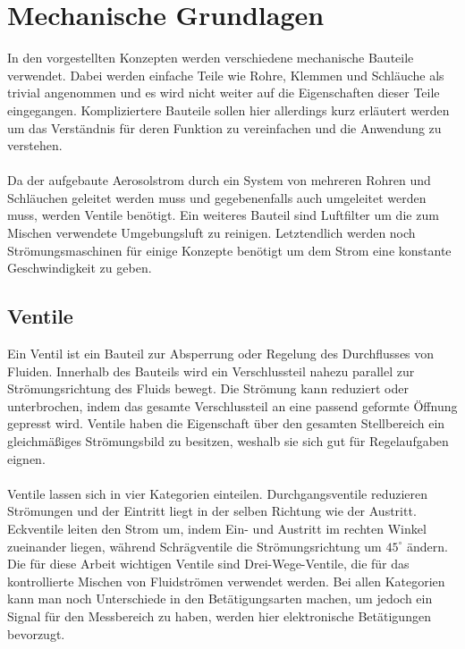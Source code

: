 \section{Mechanische Grundlagen}
In den vorgestellten Konzepten werden verschiedene mechanische Bauteile verwendet. Dabei werden einfache Teile wie Rohre, Klemmen und Schl\"{a}uche als trivial angenommen und es wird nicht weiter auf die Eigenschaften dieser Teile eingegangen. Kompliziertere Bauteile sollen hier allerdings kurz erl\"{a}utert werden um das Verst\"{a}ndnis f\"{u}r deren Funktion zu vereinfachen und die Anwendung zu verstehen.
\\\\
Da der aufgebaute Aerosolstrom durch ein System von mehreren Rohren und Schl\"{a}uchen geleitet werden muss und gegebenenfalls auch umgeleitet werden muss, werden Ventile ben\"{o}tigt. Ein weiteres Bauteil sind Luftfilter um die zum Mischen verwendete Umgebungsluft zu reinigen. Letztendlich werden noch Str\"{o}mungsmaschinen f\"{u}r einige Konzepte ben\"{o}tigt um dem Strom eine konstante Geschwindigkeit zu geben.

\subsection{Ventile}
Ein Ventil ist ein Bauteil zur Absperrung oder Regelung des Durchflusses von Fluiden. Innerhalb des Bauteils wird ein Verschlussteil nahezu parallel zur Str\"{o}mungsrichtung des Fluids bewegt. Die Str\"{o}mung kann reduziert oder unterbrochen, indem das gesamte Verschlussteil an eine passend geformte \"{O}ffnung gepresst wird. Ventile haben die Eigenschaft \"{u}ber den gesamten Stellbereich ein gleichm\"{a}{\ss}iges Str\"{o}mungsbild zu besitzen, weshalb sie sich gut f\"{u}r Regelaufgaben eignen.
\\\\
Ventile lassen sich in vier Kategorien einteilen. Durchgangsventile reduzieren Str\"{o}mungen und der Eintritt liegt in der selben Richtung wie der Austritt. Eckventile leiten den Strom um, indem Ein- und Austritt im rechten Winkel zueinander liegen, w\"{a}hrend Schr\"{a}gventile die Str\"{o}mungsrichtung um \(45^\circ\) \"{a}ndern. Die f\"{u}r diese Arbeit wichtigen Ventile sind Drei-Wege-Ventile, die f\"{u}r das kontrollierte Mischen von Fluidstr\"{o}men verwendet werden. Bei allen Kategorien kann man noch Unterschiede in den Bet\"{a}tigungsarten machen, um jedoch ein Signal f\"{u}r den Messbereich zu haben, werden hier elektronische Bet\"{a}tigungen bevorzugt.

